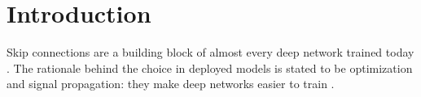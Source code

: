 \documentclass[10pt]{article}
\theoremstyle{definition}
\theoremstyle{remark}
\newcommand{\dm}{d_{\mathrm{model}}}
\begin{document}
\begin{abstract}
\end{abstract}

\section{Introduction}\label{sec:intro}

Skip connections are a building block of almost every deep network trained today \citep{he2016resnet}. The rationale behind the choice in deployed models is stated to be optimization and signal propagation: they make deep networks easier to train \citep{he2016resnet,balduzzi2017shattered,orhan2018skip,macdonald2023skip}.
\end{document}
